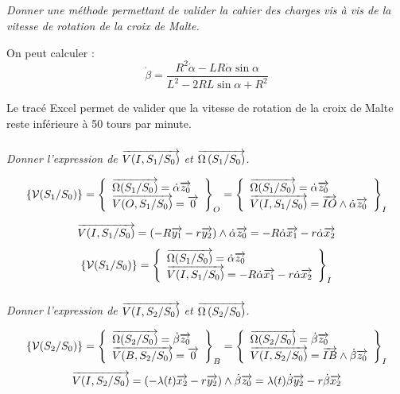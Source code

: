 \documentclass[10pt,fleqn]{article} %
\begin{document}
\begin{multicols}{2}
\subparagraph{}
\textit{Donner une méthode permettant de valider la cahier des charges vis à vis de la vitesse de rotation de la croix de Malte.}


\ifprof%
\begin{corrige}

On peut calculer : 
$$
\dot{\beta} = \dfrac{R^2\dot{\alpha} - LR\dot{\alpha}\sin\alpha }{L^2-2RL\sin\alpha + R^2}
$$

Le tracé Excel permet de valider que la vitesse de rotation de la croix de Malte reste inférieure à 50 tours par minute.

\end{corrige}
\else \fi


\subparagraph{}
\textit{Donner l'expression de $\overrightarrow{V(I,S_1/S_0)}$ et $\overrightarrow{\Omega\left( {S_1}/{S_0}\right)}$.}

\ifprof%
\begin{corrige}

$$\{\mathcal{V}(S_1/S_0)\} = 
\left\{
\begin{array}{l}
\overrightarrow{\Omega(S_1/S_0)} = \dot{\alpha}\overrightarrow{z_0} \\
\overrightarrow{V(O,S_1/S_0)} = \overrightarrow{0}
\end{array}
\right\}_O =
\left\{
\begin{array}{l}
\overrightarrow{\Omega(S_1/S_0)} = \dot{\alpha}\overrightarrow{z_0} \\
\overrightarrow{V(I,S_1/S_0)} = \overrightarrow{IO} \wedge \dot{\alpha}\overrightarrow{z_0}
\end{array}
\right\}_I
$$

$$
\overrightarrow{V(I,S_1/S_0)} =\left( -R\overrightarrow{y_1} - r \overrightarrow{y_2} \right) \wedge \dot{\alpha}\overrightarrow{z_0} =- R\dot{\alpha}\overrightarrow{x_1} - r\dot{\alpha}\overrightarrow{x_2}
$$
$$\{\mathcal{V}(S_1/S_0)\} = 
\left\{
\begin{array}{l}
\overrightarrow{\Omega(S_1/S_0)} = \dot{\alpha}\overrightarrow{z_0} \\
\overrightarrow{V(I,S_1/S_0)} = -R\dot{\alpha}\overrightarrow{x_1} - r\dot{\alpha}\overrightarrow{x_2}
\end{array}
\right\}_I
$$

\end{corrige}
\else \fi

\subparagraph{}
\textit{Donner l'expression de $\overrightarrow{V(I,S_2/S_0)}$ et $\overrightarrow{\Omega\left( {S_2}/{S_0}\right)}$.}
\ifprof%
\begin{corrige}
$$\{\mathcal{V}(S_2/S_0)\} = 
\left\{
\begin{array}{l}
\overrightarrow{\Omega(S_2/S_0)} = \dot{\beta}\overrightarrow{z_0} \\
\overrightarrow{V(B,S_2/S_0)} = \overrightarrow{0}
\end{array}
\right\}_B =
\left\{
\begin{array}{l}
\overrightarrow{\Omega(S_2/S_0)} = \dot{\beta}\overrightarrow{z_0} \\
\overrightarrow{V(I,S_2/S_0)} = \overrightarrow{IB} \wedge \dot{\beta}\overrightarrow{z_0}
\end{array}
\right\}_I
$$
$$
\overrightarrow{V(I,S_2/S_0)} =\left( -\lambda(t)\overrightarrow{x_2} - r \overrightarrow{y_2} \right) \wedge \dot{\beta}\overrightarrow{z_0} = \lambda(t) \dot{\beta}\overrightarrow{y_2} - r\dot{\beta}\overrightarrow{x_2}
$$


\end{corrige}
\end{multicols}
\end{document}
